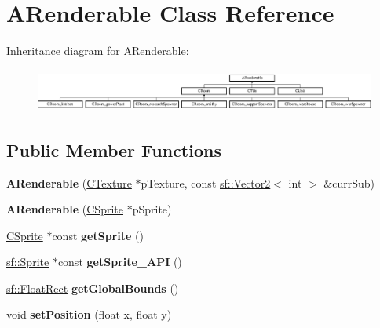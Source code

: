 \hypertarget{classARenderable}{\section{A\-Renderable Class Reference}
\label{classARenderable}
}
Inheritance diagram for A\-Renderable\-:\begin{figure}[H]
\begin{center}
\leavevmode
\includegraphics[height=1.428571cm]{classARenderable}
\end{center}
\end{figure}
\subsection*{Public Member Functions}
\begin{DoxyCompactItemize}
\item 
\hypertarget{classARenderable_a945fecfa1012fc94f186b8814f225ae8}{{\bfseries A\-Renderable} (\hyperlink{classCTexture}{C\-Texture} $\ast$p\-Texture, const \hyperlink{classsf_1_1Vector2}{sf\-::\-Vector2}$<$ int $>$ \&curr\-Sub)}\label{classARenderable_a945fecfa1012fc94f186b8814f225ae8}

\item 
\hypertarget{classARenderable_a3d575592900ff1796452f35e7c618e6d}{{\bfseries A\-Renderable} (\hyperlink{classCSprite}{C\-Sprite} $\ast$p\-Sprite)}\label{classARenderable_a3d575592900ff1796452f35e7c618e6d}

\item 
\hypertarget{classARenderable_a4dc17477a94447c2ece7c418a47e3860}{\hyperlink{classCSprite}{C\-Sprite} $\ast$const {\bfseries get\-Sprite} ()}\label{classARenderable_a4dc17477a94447c2ece7c418a47e3860}

\item 
\hypertarget{classARenderable_a2cbb5617817d6697fd817f87bceebf77}{\hyperlink{classsf_1_1Sprite}{sf\-::\-Sprite} $\ast$const {\bfseries get\-Sprite\-\_\-\-A\-P\-I} ()}\label{classARenderable_a2cbb5617817d6697fd817f87bceebf77}

\item 
\hypertarget{classARenderable_a77d3d8b9f8d7f0e8b860abba2f6c53c9}{\hyperlink{classsf_1_1Rect}{sf\-::\-Float\-Rect} {\bfseries get\-Global\-Bounds} ()}\label{classARenderable_a77d3d8b9f8d7f0e8b860abba2f6c53c9}

\item 
\hypertarget{classARenderable_a1d0db7e6ba2e9bf6d8accb4164531b46}{void {\bfseries set\-Position} (float x, float y)}\label{classARenderable_a1d0db7e6ba2e9bf6d8accb4164531b46}

\end{DoxyCompactItemize}
